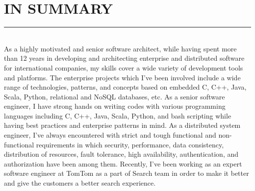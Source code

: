 \documentclass[10pt,a4paper]{article}
\begin{document}
\thispagestyle{fancy}

\hfill \break
\section{IN SUMMARY}
\noindent \rule {3.4cm}{0.4pt} \\
As a highly motivated and senior software architect, while having spent more than 12 years in developing and architecting enterprise and distributed software for international companies, my skills cover a wide variety of development tools and platforms. The enterprise projects which I've been involved include a wide range of technologies, patterns, and concepts based on embedded C, C++, Java, Scala, Python, relational and NoSQL databases, etc. As a senior software engineer, I have strong hands on writing codes with various programming languages including C, C++, Java, Scala, Python, and bash scripting while having best practices and enterprise patterns in mind. As a distributed system engineer, I've always encountered with strict and tough functional and non-functional requirements in which security, performance, data consistency, distribution of resources, fault tolerance, high availability, authentication, and authorization have been among them. Recently, I've been working as an expert software engineer at TomTom as a part of Search team in order to make it better and give the customers a better search experience.
\end{document}
